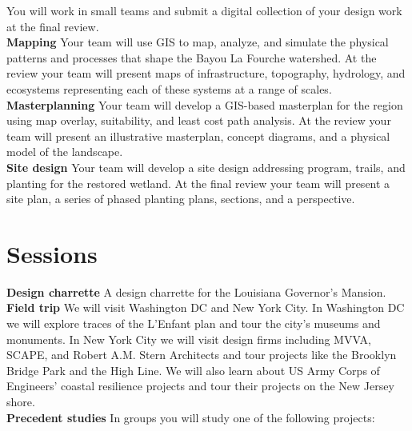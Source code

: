 \documentclass[11pt,article,oneside]{memoir}
\begin{document}
You will work in small teams 
and submit a digital collection of your design work
at the final review. \\

\noindent \textbf{Mapping}
Your team will use GIS to map, analyze, and simulate 
the physical patterns and processes that shape
the Bayou La Fourche watershed. 
At the review your team will present
maps of infrastructure, topography, hydrology, and ecosystems
representing each of these systems at a range of scales. 
\\

\noindent \textbf{Masterplanning}
Your team will develop a GIS-based masterplan for the region 
using map overlay, suitability, and least cost path analysis. 
At the review your team will present
an illustrative masterplan, concept diagrams,
and a physical model of the landscape.
\\

\noindent \textbf{Site design}
Your team will develop a site design
addressing program, trails, and planting
for the restored wetland.
At the final review your team will present
a site plan, a series of phased planting plans,
sections, and a perspective.
\\


\section{Sessions}

\noindent \textbf{Design charrette}
A design charrette for the Louisiana Governor's Mansion.\\

\noindent \textbf{Field trip}
We will visit Washington DC and New York City. 
In Washington DC we will explore traces of the L'Enfant plan
and tour the city's museums and monuments.
In New York City we will visit design firms including 
MVVA, SCAPE, and Robert A.M. Stern Architects  
and tour projects like the Brooklyn Bridge Park and the High Line.
We will also learn about 
US Army Corps of Engineers' coastal resilience projects
and tour their projects on the New Jersey shore.\\

\noindent \textbf{Precedent studies}
In groups you will study one of the following projects:\\
\end{document}
